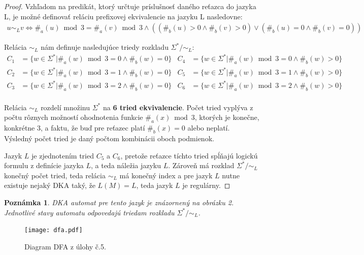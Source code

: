 \documentclass[10pt]{article}
\begin{document}
\begin{proof}
Vzhľadom na predikát, ktorý určtuje príslušnosť daného reťazca do jazyka L, je možné definovať
    reláciu prefixovej ekvivalencie na jazyku L nasledovne:
\begin{align*}
u \sim_L v \iff \#_a(u)\bmod 3 = \#_a(v)\bmod 3 \land ((\#_b(u) > 0 \land \#_b(v) > 0) \lor (\#_b(u) = 0 \land
\#_b(v) = 0))
\end{align*}

Relácia $\sim_L$ nám definuje nasledujúce triedy rozkladu $\Sigma^* / \sim_L$:
\begin{align*}
    C_1 &= \{ w \in \Sigma^* | \#_a(w) \bmod 3 = 0 \land \#_b(w) = 0 \} & C_4 &= \{ w \in \Sigma^* | \#_a(w) \bmod 3 = 0 \land \#_b(w) > 0 \} \\
    C_2 &= \{ w \in \Sigma^* | \#_a(w) \bmod 3 = 1 \land \#_b(w) = 0 \} & C_5 &= \{ w \in \Sigma^* | \#_a(w) \bmod 3 = 1 \land \#_b(w) > 0 \} \\
    C_3 &= \{ w \in \Sigma^* | \#_a(w) \bmod 3 = 2 \land \#_b(w) = 0 \} & C_6 &= \{ w \in \Sigma^* | \#_a(w) \bmod 3 = 2 \land \#_b(w) > 0 \} \\
\end{align*}

Relácia $\sim_L$ rozdelí množinu $\Sigma^*$ na \textbf{6 tried ekvivalencie}. Počet tried vyplýva z
    počtu rôznych možností ohodnotenia funkcie $\#_a(x) \bmod 3$, ktorých je konečne, konkrétne 3, a faktu, že buď pre reťazec
    platí $\#_b(x) = 0$ alebo neplatí. Výsledný počet tried je daný počtom kombinácii oboch
    podmienok.   

Jazyk $L$ je zjednotením tried $C_5$ a $C_6$, pretože reťazce tíchto tried spĺňajú logickú formulu
z definície jazyka $L$, a teda náležia jazyku $L$. Zároveň má rozklad $\Sigma^* / \sim_L$ konečný
počet tried, teda relácia $\sim_L$ má konečný index a pre jazyk $L$ nutne existuje nejaký DKA taký,
že $L(M) = L$, teda jazyk $L$ je regulárny. 
\end{proof}
\newtheorem*{remark}{Poznámka}
\begin{remark}
DKA automat pre tento jazyk je znázornený na obrázku 2. Jednotlivé stavy automatu odpovedajú
    triedam rozkladu $\Sigma^* / \sim_L$.
\end{remark}
\begin{figure}[h!]
    \label{automata}
    \centering
    \texttt{[image: dfa.pdf]}
    \caption{Diagram DFA z úlohy č.5.}
\end{figure}
\end{document}
